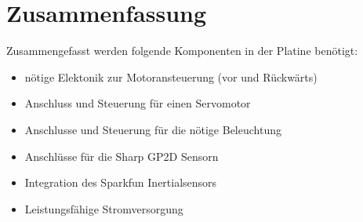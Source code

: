\section{Zusammenfassung}

Zusammengefasst werden folgende Komponenten in der Platine benötigt:

\begin{itemize}
 \item nötige Elektonik zur Motoransteuerung (vor und Rückwärts)
 \item Anschluss und Steuerung für einen Servomotor
 \item Anschlusse und Steuerung für die nötige Beleuchtung
 \item Anschlüsse für die Sharp GP2D Sensorn
 \item Integration des Sparkfun Inertialsensors
 \item Leistungsfähige Stromversorgung
\end{itemize}









% 

